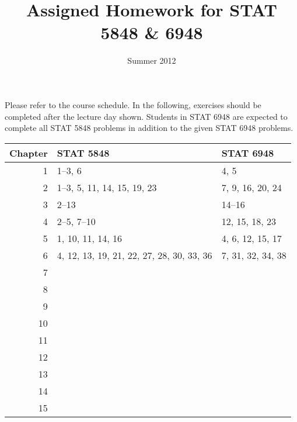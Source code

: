 \documentclass[11pt]{article}
\title{\vspace{-0.5in}Assigned Homework for STAT 5848 \& 6948}
\date{\vspace{-0.5in}Summer 2012}
\begin{document}
\maketitle


Please refer to the course schedule.  In the following, exercises should be completed after the lecture day shown.  Students in STAT 6948 are expected to complete all STAT 5848 problems in addition to the given STAT 6948 problems.

\vspace{0.25in}


\begin{center}
\begin{tabular}{rll}
 \textbf{Chapter}  &  \textbf{STAT 5848}                         &  \textbf{STAT 6948}  \\
\hline
                1  &  1--3, 6                                    &  4, 5                \\
                2  &  1--3, 5, 11, 14, 15, 19, 23                &  7, 9, 16, 20, 24    \\
                3  &  2--13                                      &  14--16              \\
                4  &  2--5, 7--10                                &  12, 15, 18, 23      \\
                5  &  1, 10, 11, 14, 16                          &  4, 6, 12, 15, 17    \\
                6  &  4, 12, 13, 19, 21, 22, 27, 28, 30, 33, 36  &  7, 31, 32, 34, 38   \\
                7  &                                             &                      \\
                8  &                                             &                      \\
                9  &                                             &                      \\
               10  &                                             &                      \\
               11  &                                             &                      \\
               12  &                                             &                      \\
               13  &                                             &                      \\
               14  &                                             &                      \\
               15  &                                             &                      \\
\hline
\end{tabular}
\end{center}
\end{document}
